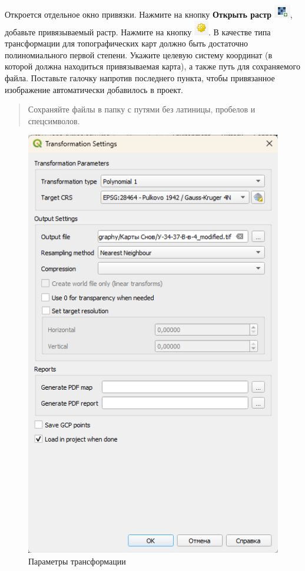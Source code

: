 \documentclass[
  12pt,
]{book}
\begin{document}
Откроется отдельное окно привязки. Нажмите на кнопку \textbf{Открыть растр} \includegraphics{images/Georeference/Open_raster.png}, добавьте привязываемый растр. Нажмите на кнопку \includegraphics{images/Georeference/Transformation_settings.png}. В качестве типа трансформации для топографических карт должно быть достаточно полиномиального первой степени. Укажите целевую систему координат (в которой должна находиться привязываемая карта), а также путь для сохраняемого файла. Поставьте галочку напротив последнего пункта, чтобы привязанное изображение автоматически добавилось в проект.

\begin{quote}
Сохраняйте файлы в папку с путями без латиницы, пробелов и спецсимволов.
\end{quote}

\begin{figure}
\centering
\includegraphics{images/Georeference/Transformation_parameters.png}
\caption{Параметры трансформации}
\end{figure}
\end{document}
